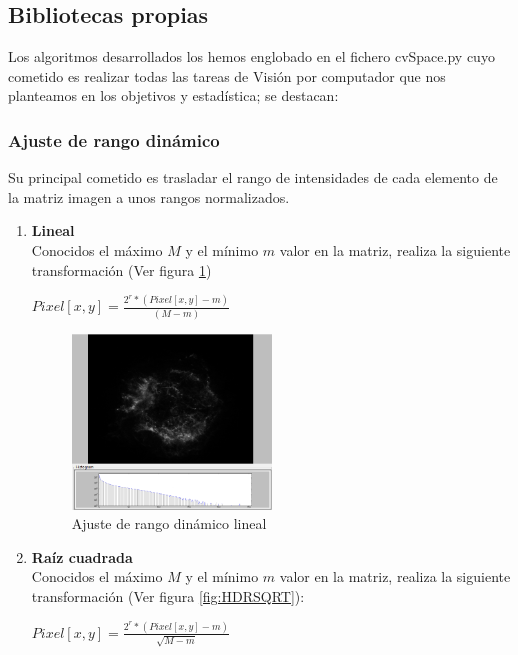 	\subsection{Bibliotecas propias}\label{ownLib}
	Los algoritmos desarrollados los hemos englobado en el fichero cvSpace.py cuyo cometido es realizar todas las tareas de Visión por computador que nos planteamos en los objetivos y estadística; se destacan:
	\subsubsection{Ajuste de rango dinámico}
	Su principal cometido es trasladar el rango de intensidades de cada elemento de la matriz imagen a unos rangos normalizados.\\

	\begin{enumerate}
		\item \textbf{Lineal}\\
		Conocidos el máximo $M$ y el mínimo $m$ valor en la matriz, realiza
		la siguiente transformación (Ver figura \ref{fig:HDRLineal})\\
			\begin{center}
				{\large $Pixel[x,y]=\frac{2^{r}*(Pixel[x,y]-m)}{(M-m)}$}				
			\end{center}
			\begin{figure}[!htb]
				\centering
				\includegraphics[width=0.5\textwidth]{images/HDREQ/chandraLineal.PNG}
				\caption{\label{fig:HDRLineal}{\small Ajuste de rango dinámico lineal}}
			\end{figure}
		\newpage
		\item \textbf{Raíz cuadrada}\\
		Conocidos el máximo $M$ y el mínimo $m$ valor en la matriz, realiza
		la siguiente transformación (Ver figura \ref{fig:HDRSQRT}):
			\begin{center}
			{\large $Pixel[x,y]=\frac{2^{r}*(Pixel[x,y]-m)}{\sqrt{M-m}}$}			
			\end{center}
		

\end{enumerate}
